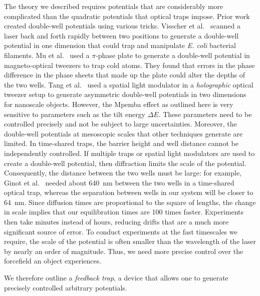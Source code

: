 \documentclass[hyperref={colorlinks=true, urlcolor=blue, citecolor=blue, final, bound}]{sfuthesis}
\begin{document}
The theory we described requires potentials that are considerably more complicated than the quadratic potentials that optical traps impose. Prior work created double-well potentials using various tricks. Visscher et al.~\cite{Visscher1993} scanned a laser back and forth rapidly between two positions to generate a double-well potential in one dimension that could trap and manipulate \textit{E. coli} bacterial filaments. Mu et al.~\cite{Mu2010} used a $\pi$-phase plate to generate a double-well potential in magneto-optical tweezers to trap cold atoms. They found that errors in the phase difference in the phase sheets that made up the plate could alter the depths of the two wells. Tang et al.~\cite{Tang2021} used a spatial light modulator in a \textit{holographic} optical tweezer setup to generate asymmetric double-well potentials in two dimensions for nanoscale objects. However, the Mpemba effect as outlined here is very sensitive to parameters such as the tilt energy $\Delta E$. These parameters need to be controlled precisely and not be subject to large uncertainties. Moreover, the double-well potentials at mesoscopic scales that other techniques generate are limited. In time-shared traps, the barrier height and well distance cannot be independently controlled. If multiple traps or spatial light modulators are used to create a double-well potential, then diffraction limits the scale of the potential. Consequently, the distance between the two wells must be large: for example, Ginot et al.~\cite{Ginot2022} needed about \qty{640}{\nano\metre} between the two wells in a time-shared optical trap, whereas the separation between wells in our system will be closer to \qty{64}{\nano\metre}. Since diffusion times are proportional to the square of lengths, the change in scale implies that our equilibration times are \num{100} times faster. Experiments then take minutes instead of hours, reducing drifts that are a much more significant source of error. To conduct experiments at the fast timescales we require, the scale of the potential is often smaller than the wavelength of the laser by nearly an order of magnitude. Thus, we need more precise control over the forcefield an object experiences.

We therefore outline a \textit{feedback trap}, a device that allows one to generate precisely controlled arbitrary potentials.
\end{document}
